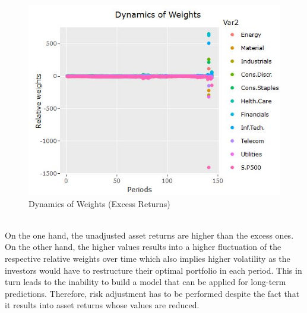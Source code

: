 \documentclass{article}
\begin{document}
\begin {figure}[H]
    \begin{center}
    \includegraphics[scale=0.7]{dn_wg_adj_MV.JPG}
    \caption{Dynamics of Weights (Excess Returns)}
    \end{center}
\end{figure}\\
On the one hand, the unadjusted asset returns are higher than the excess ones. On the other hand, the higher values results into a higher fluctuation of the respective relative weights over time which also implies higher volatility as the investors would have to restructure their optimal portfolio in each period. This in turn leads to the inability to build a model that can be applied for long-term predictions. Therefore, risk adjustment has to be performed despite the fact that it results into asset returns whose values are reduced.
\end{document}

